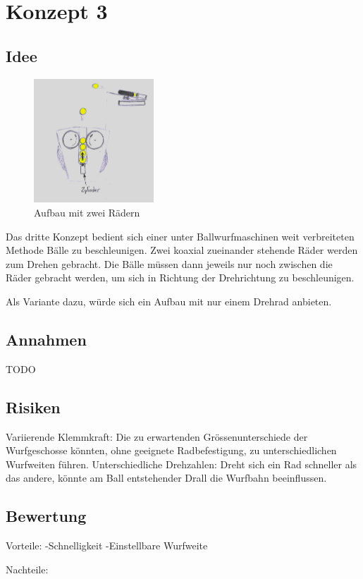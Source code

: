\section{Konzept 3}

\subsection{Idee}
\begin{figure}[h!]
	\centering
	\includegraphics[width=0.4\textwidth]{../../fig/Wurfmaschine_Drehraeder.png}
	\caption{Aufbau mit zwei Rädern}
	\label{fig:drehradmaschine}
\end{figure}

Das dritte Konzept bedient sich einer unter Ballwurfmaschinen weit verbreiteten Methode Bälle zu beschleunigen. Zwei koaxial zueinander stehende Räder werden zum Drehen gebracht. Die Bälle müssen dann jeweils nur noch zwischen die Räder gebracht werden, um sich in Richtung der Drehrichtung zu beschleunigen.  

Als Variante dazu, würde sich ein Aufbau mit nur einem Drehrad anbieten.


\subsection{Annahmen}
TODO

\subsection{Risiken}
Variierende Klemmkraft: Die zu erwartenden Grössenunterschiede der Wurfgeschosse könnten, ohne geeignete Radbefestigung, zu unterschiedlichen Wurfweiten führen.
Unterschiedliche Drehzahlen: Dreht sich ein Rad schneller als das andere, könnte am Ball entstehender Drall die Wurfbahn beeinflussen.

\subsection{Bewertung}
Vorteile:
-Schnelligkeit
-Einstellbare Wurfweite

Nachteile:
